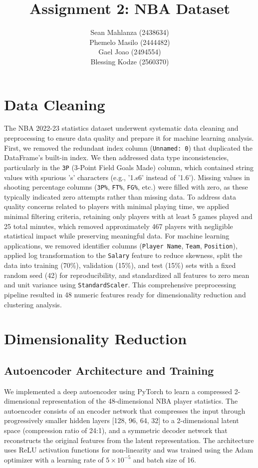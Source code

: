 \documentclass{article}
\title{Assignment 2: NBA Dataset}
\author{%
 Sean Mahlanza (2438634) \\ 
 Phemelo Masilo (2444482) \\
 Gael Joao (2494554) \\
 Blessing Kodze (2560370) \\
}
\begin{document}
\maketitle

\section{Data Cleaning}

The NBA 2022-23 statistics dataset underwent systematic data cleaning and preprocessing to ensure data quality and prepare it for machine learning analysis. First, we removed the redundant index column (\texttt{Unnamed: 0}) that duplicated the DataFrame's built-in index. We then addressed data type inconsistencies, particularly in the \texttt{3P} (3-Point Field Goals Made) column, which contained string values with spurious 's' characters (e.g., '1.s6' instead of '1.6'). Missing values in shooting percentage columns (\texttt{3P\%}, \texttt{FT\%}, \texttt{FG\%}, etc.) were filled with zero, as these typically indicated zero attempts rather than missing data. To address data quality concerns related to players with minimal playing time, we applied minimal filtering criteria, retaining only players with at least 5 games played and 25 total minutes, which removed approximately 467 players with negligible statistical impact while preserving meaningful data. For machine learning applications, we removed identifier columns (\texttt{Player Name}, \texttt{Team}, \texttt{Position}), applied log transformation to the \texttt{Salary} feature to reduce skewness, split the data into training (70\%), validation (15\%), and test (15\%) sets with a fixed random seed (42) for reproducibility, and standardized all features to zero mean and unit variance using \texttt{StandardScaler}. This comprehensive preprocessing pipeline resulted in 48 numeric features ready for dimensionality reduction and clustering analysis.

\section{Dimensionality Reduction}

\subsection{Autoencoder Architecture and Training}

We implemented a deep autoencoder using PyTorch to learn a compressed 2-dimensional representation of the 48-dimensional NBA player statistics. The autoencoder consists of an encoder network that compresses the input through progressively smaller hidden layers [128, 96, 64, 32] to a 2-dimensional latent space (compression ratio of 24:1), and a symmetric decoder network that reconstructs the original features from the latent representation. The architecture uses ReLU activation functions for non-linearity and was trained using the Adam optimizer with a learning rate of $5 \times 10^{-5}$ and batch size of 16.
\end{document}
